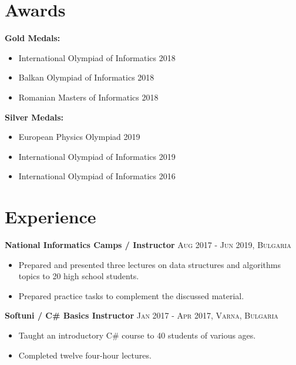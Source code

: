 \documentclass[letterpaper,11pt]{article}
\newcommand{\noskip}{\vspace{-\parskip}}
\begin{document}
\section*{Awards}
\textbf{Gold Medals:}
\noskip
\begin{itemize}
    \item International Olympiad of Informatics 2018
    \item Balkan Olympiad of Informatics 2018
    \item Romanian Masters of Informatics 2018
\end{itemize}

\textbf{Silver Medals:}
\noskip
\begin{itemize}
    \item European Physics Olympiad 2019
    \item International Olympiad of Informatics 2019
    \item International Olympiad of Informatics 2016
\end{itemize}

\section*{Experience}
\textbf{National Informatics Camps / Instructor}
\hfill
\textsc{Aug 2017 - Jun 2019, Bulgaria}
\noskip
\begin{itemize}
    \item Prepared and presented three lectures on data structures and algorithms topics to 20 high school students.
    \item Prepared practice tasks to complement the discussed material.
\end{itemize}
\textbf{Softuni / C\# Basics Instructor}
\hfill
\textsc{Jan 2017 - Apr 2017, Varna, Bulgaria}
\noskip
\begin{itemize}
    \item Taught an introductory C\# course to 40  students of various ages.
    \item Completed twelve four-hour lectures.
\end{itemize}
\end{document}
